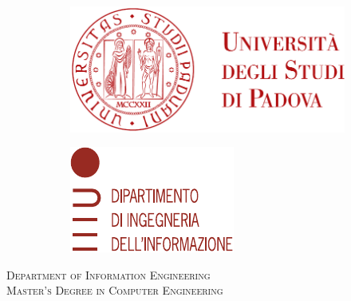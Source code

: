 \begin{titlepage}
	\begin{figure}
		\centering
		\begin{subfigure}[b]{0.4\textwidth}
			\includegraphics[width=\textwidth]{images/logo_unipd}
		\end{subfigure}
		\hfill
		\begin{subfigure}[b]{0.3\textwidth}
			\includegraphics[width=\textwidth]{images/logo_dei}
		\end{subfigure}
	\end{figure}


	\begin{center}
		\makeatletter %

		\large
		\textsc{Department of Information Engineering}\\
		\textsc{Master's Degree in Computer Engineering}


\end{center}
\end{titlepage}
